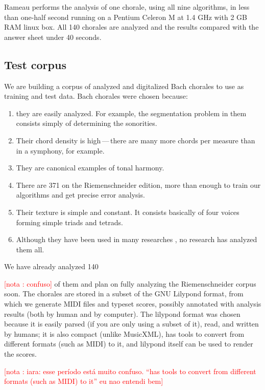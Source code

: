 \documentclass{article}
\newcounter{notacounter}
\newcommand{\nota}[1]{
  \addtocounter{notacounter}{1}
  \textcolor{red}{[nota \arabic{notacounter}: #1]}
}
\begin{document}
Rameau performs the analysis of one chorale, using all nine
algorithms, in less than one-half second running on a Pentium Celeron
M at 1.4 GHz with 2 GB RAM linux box. All 140 chorales are analyzed
and the results compared with the answer sheet under 40 seconds.

\subsection{Test corpus}
\label{sec:test-corpus}

We are building a corpus of analyzed and digitalized Bach chorales to
use as training and test data. Bach chorales were chosen because:

\begin{enumerate}
\item they are easily analyzed. For example, the segmentation problem in
them consists simply of determining the sonorities.
\item Their chord density is high\,---\,there are many more chords per
  measure than in a symphony, for example.
\item They are canonical examples of tonal harmony.
\item There are 371 on the Riemenschneider edition, more than
  enough to train our algorithms and get precise error analysis.
\item Their texture is simple and constant. It consists basically of
  four voices forming simple triads and tetrads.
\item Although they have been used in many researches
  \cite{taube:automatic, tsui:harmonic, illescas.ea:harmonic,
    winograd:linguistics}, no research has analyzed them all.
\end{enumerate}

We have already analyzed 140 \nota{confuso} of them and plan on fully
analyzing the Riemenschneider corpus soon. The chorales are stored in
a subset of the GNU Lilypond format, from which we generate MIDI files
and typeset scores, possibly annotated with analysis results (both by
human and by computer). The lilypond format was chosen because it is
easily parsed (if you are only using a subset of it), read, and
written by humans; it is also compact (unlike MusicXML), has tools to
convert from different formats (such as MIDI) to it, and lilypond
itself can be used to render the scores. \nota{iara: esse período está
  muito confuso. ``has tools to convert from different formats (such
  as MIDI) to it'' eu nao entendi bem}
\end{document}
